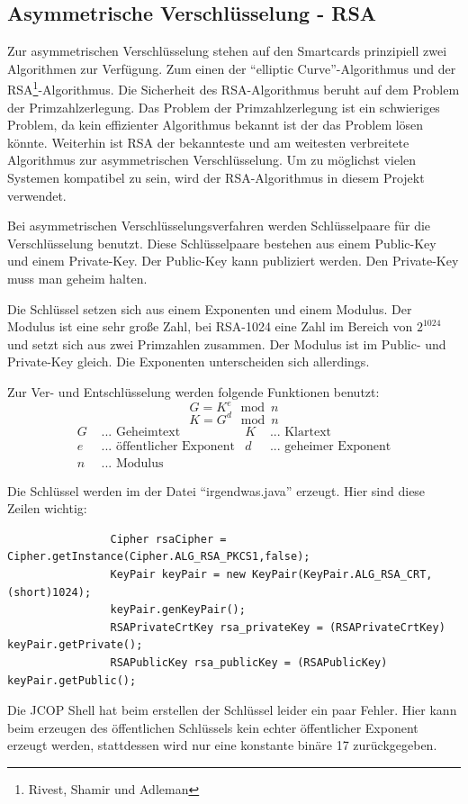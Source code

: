 \documentclass[parskip]{scrartcl}
\begin{document}
		\subsection{Asymmetrische Verschlüsselung - RSA}
			Zur asymmetrischen Verschlüsselung stehen auf den Smartcards prinzipiell zwei Algorithmen zur Verfügung. Zum einen der \enquote{elliptic Curve}-Algorithmus und der RSA\footnote{Rivest, Shamir und Adleman}-Algorithmus. Die Sicherheit des RSA-Algorithmus beruht auf dem Problem der Prim\-zahl\-zerlegung. Das Problem der Primzahlzerlegung ist ein schwieriges Problem, da kein effizienter Algorithmus bekannt ist der das Problem lösen könnte. Weiterhin ist RSA der bekannteste und am weitesten verbreitete Algorithmus zur asymmetrischen Verschlüsselung. Um zu möglichst vielen Systemen kompatibel zu sein, wird der RSA-Algorithmus in diesem Projekt verwendet.
			
			Bei asymmetrischen Verschlüsselungsverfahren werden Schlüsselpaare für die Verschlüs\-selung benutzt. Diese Schlüsselpaare bestehen aus einem Public-Key und einem Private-Key. Der Public-Key kann publiziert werden. Den Private-Key muss man geheim halten.
		
			Die Schlüssel setzen sich aus einem Exponenten und einem Modulus. Der Modulus ist eine sehr große Zahl, bei RSA-1024 eine Zahl im Bereich von $ 2^{1024} $ und setzt sich aus zwei Primzahlen zusammen. Der Modulus ist im Public- und Private-Key gleich. Die Exponenten unterscheiden sich allerdings.
		
			Zur Ver- und Entschlüsselung werden folgende Funktionen benutzt:  
			 $$ G = K^{e}\mod{n} $$
			 $$ K = G^{d}\mod{n} $$
			 \begin{align*}
			  G & \text{ ... Geheimtext} & K & \text{ ... Klartext} \\
			  e & \text{ ... öffentlicher Exponent} & d & \text{ ... geheimer Exponent} \\
			  n & \text{ ... Modulus} & &
			 \end{align*}
			 
			Die Schlüssel werden im der Datei \enquote{irgendwas.java} erzeugt. Hier sind diese Zeilen wichtig:
			\label{RSAKeyPair}
			\begin{lstlisting}
				Cipher rsaCipher = Cipher.getInstance(Cipher.ALG_RSA_PKCS1,false);
				KeyPair keyPair = new KeyPair(KeyPair.ALG_RSA_CRT, (short)1024);
				keyPair.genKeyPair();
				RSAPrivateCrtKey rsa_privateKey = (RSAPrivateCrtKey) keyPair.getPrivate();
				RSAPublicKey rsa_publicKey = (RSAPublicKey) keyPair.getPublic();
			\end{lstlisting}
			Die JCOP Shell hat beim erstellen der Schlüssel leider ein paar Fehler. Hier kann beim erzeugen des öffentlichen Schlüssels kein echter öffentlicher Exponent erzeugt werden, stattdessen wird nur eine konstante binäre 17 zurückgegeben.
		
\end{document}
